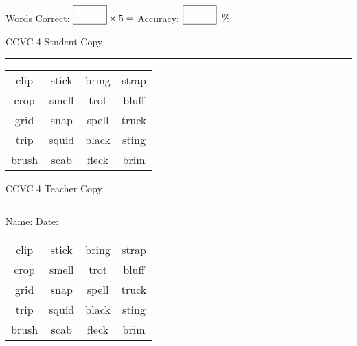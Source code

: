 \documentclass{memoir}
\begin{document}
\normalsize

Words Correct: $\fbox{\phantom{\huge 100}} \times 5 = $ Accuracy: $\fbox{\phantom{\huge 100}}\;\; \%$ 

\vfill

\newpage


\footnotesize \noindent
CCVC 4 \hfill Student Copy
\smallskip
\hrule

\Large

\setlength{\tabcolsep}{14pt}
\def\arraystretch{3}

{\selectfont


\begin{vplace}[0.5]
\begin{center}
\begin{tabular}{cccc}
clip & stick & bring      & strap \\
crop & smell & trot & bluff \\
grid & snap & spell & truck \\
trip & squid & black            & sting \\
brush & scab & fleck             & brim      \\
\end{tabular}
\end{center}
\end{vplace}

}

\newpage

\footnotesize \noindent
CCVC 4 \hfill Teacher Copy
\smallskip
\hrule

\normalsize

\vfill

\noindent
Name: \underline{\hspace{1.75in}} \hfill Date: \underline{\hspace{1in}}

\Large

{\selectfont


\begin{vplace}[0.5]
\begin{center}
\begin{tabular}{cccc}
clip & stick & bring      & strap \\
crop & smell & trot & bluff \\
grid & snap & spell & truck \\
trip & squid & black            & sting \\
brush & scab & fleck             & brim      \\
\end{tabular}
\end{center}
\end{vplace}



}
\end{document}
